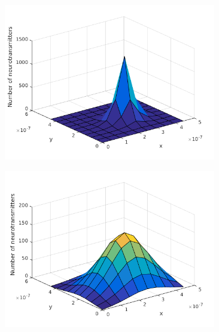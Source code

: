 \documentclass[screen]{beamer}
\begin{document}
\begin{frame}
\begin{columns}
\begin{column}{.5\linewidth}
\begin{figure}
  		\end{figure}
    \end{column}
    \begin{column}{.5\linewidth}
        \begin{figure}
  		\includegraphics[scale=0.25]{distneurottansmitters5ms}
  		\end{figure}
  		\begin{figure}
  		\includegraphics[scale=0.25]{distneurottansmitters}
  		\end{figure}
    \end{column}
  \end{columns}

\end{frame}
\end{document}
